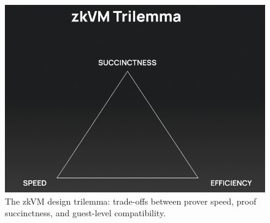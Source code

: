 \begin{figure}[h]
  \centering
  \includegraphics[width=0.7\linewidth]{Images/Chap1/zk_trilemma.png}
  \caption{The zkVM design trilemma: trade-offs between prover speed, proof succinctness, and guest-level compatibility.\label{fig:zkvm_trilemma}}
\end{figure}
